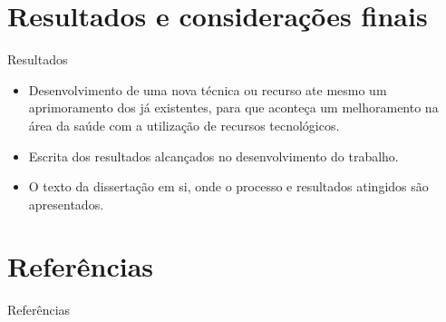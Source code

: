 \documentclass{beamer}
\begin{document}
\section{Resultados e considerações finais}
\begin{frame}{Resultados}
\begin{itemize}
    \item {Desenvolvimento de uma nova técnica ou recurso ate mesmo um aprimoramento dos já existentes, para que aconteça um melhoramento na área da saúde com a utilização de recursos tecnológicos.
    }
    \item{Escrita dos resultados alcançados no desenvolvimento do trabalho.
    }
    \item{O texto da dissertação em si, onde o processo e resultados atingidos são apresentados.}
\end{itemize}

\end{frame}

\section{Referências}
\begin{frame}{Referências}







\end{frame}
\end{document}
